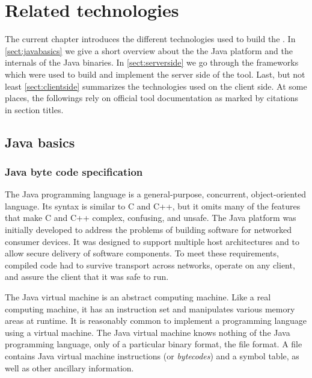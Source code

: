 \chapter{Related technologies}

The current chapter introduces the different technologies used to build the
\ptool{}. In \autoref{sect:javabasics} we give a short overview about the the
Java platform and the internals of the Java binaries. In
\autoref{sect:serverside} we go through the frameworks which were used to build
and implement the server side of the tool. Last, but not least
\autoref{sect:clientside} summarizes the technologies used on the client side.
At some places, the followings rely on official tool documentation as marked by citations in
section titles. 

\section{Java basics}\label{sect:javabasics}

\subsection{Java byte code specification~\cite{JavaSpec}}
The Java programming language is a general-purpose, concurrent,
object-oriented language. Its syntax is similar to C and C++, but it omits many
of the features that make C and C++ complex, confusing, and unsafe. The Java
platform was initially developed to address the problems of building software
for networked consumer devices. It was designed to support multiple host
architectures and to allow secure delivery of software components. To meet these
requirements, compiled code had to survive transport across networks, operate on
any client, and assure the client that it was safe to run.

The Java virtual machine is an abstract computing machine. Like a real computing
machine, it has an instruction set and manipulates various memory areas at
runtime. It is reasonably common to implement a programming language using a
virtual machine. The Java virtual machine knows nothing of the Java programming
language, only of a particular binary format, the   file format. A
 file contains Java virtual machine instructions (or 
\emph{bytecodes}) and a symbol table, as well as other ancillary information.

